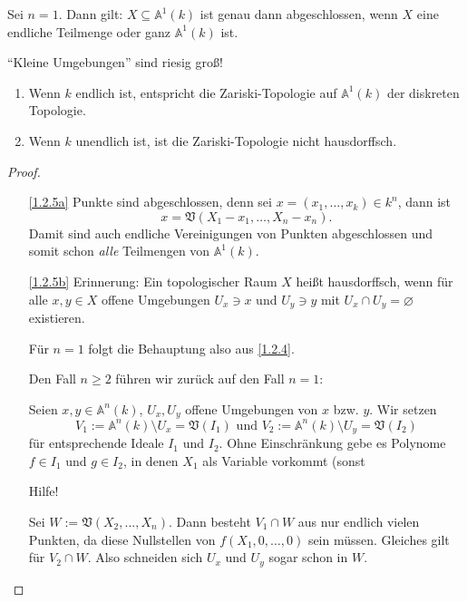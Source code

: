 \documentclass[a4paper,12pt]{scrbook}
\newtheorem{proof}{Beweis}
\def\A{\mathbb{A}}
\def\V{\mathfrak{V}}
\newcommand{\leer}{\ensuremath{\varnothing}}
\begin{document}
\begin{bsp}\label{1.2.4}
Sei $n=1$. Dann gilt: $X\subseteq\A^{1}(k)$ ist genau dann abgeschlossen, wenn $X$ eine endliche Teilmenge oder ganz $\A^{1}(k)$ ist.
\end{bsp}

\begin{w}\enquote{Kleine Umgebungen} sind riesig groß!\end{w}

\begin{bem}\label{1.2.5}
\begin{enumerate}
\item{} Wenn $k$ endlich ist, entspricht die Zariski-Topologie auf $\A^{1}(k)$ der diskreten Topologie.
\item{} Wenn $k$ unendlich ist, ist die Zariski-Topologie nicht hausdorffsch.
\end{enumerate}\end{bem}
\begin{proof}\begin{enumerate}
\item[\ref{1.2.5a}] Punkte sind abgeschlossen, denn sei $x=(x_{1},\dotsc,x_{k})\in k^{n}$, dann ist
\[{x}=\V(X_{1}-x_{1},\dotsc,X_{n}-x_{n}).\]
Damit sind auch endliche Vereinigungen von Punkten abgeschlossen und somit schon \emph{alle} Teilmengen von $\A^{1}(k)$.
\item[\ref{1.2.5b}] {\sc Erinnerung:} Ein topologischer Raum $X$ heißt hausdorffsch, wenn für alle $x,y\in X$ offene Umgebungen $U_{x}\ni x$ und $U_{y}\ni y$ mit $U_{x}\cap U_{y}=\leer$ existieren.

Für $n=1$ folgt die Behauptung also aus \cref{1.2.4}.

Den Fall $n\geq 2$ führen wir zurück auf den Fall $n=1$:

Seien $x,y\in\A^{n}(k)$, $U_{x},U_{y}$ offene Umgebungen von $x$ bzw. $y$. Wir setzen
\[V_{1}:=\A^{n}(k)\setminus U_{x} = \V(I_{1})\text{ und }V_{2}:=\A^{n}(k)\setminus U_{y}=\V(I_{2})\]
für entsprechende Ideale $I_{1}$ und $I_{2}$. Ohne Einschränkung gebe es Polynome $f\in I_{1}$ und $g\in I_{2}$, in denen $X_{1}$ als Variable vorkommt (sonst

\begin{w}Hilfe!\end{w}

Sei $W:=\V(X_{2},\dotsc,X_{n})$. Dann besteht $V_{1}\cap W$ aus nur endlich vielen Punkten, da diese Nullstellen von $f(X_{1},0,\dotsc,0)$ sein müssen. Gleiches gilt für $V_{2}\cap W$. Also schneiden sich $U_{x}$ und $U_{y}$ sogar schon in $W$.
\end{enumerate}\end{proof}
\end{document}
